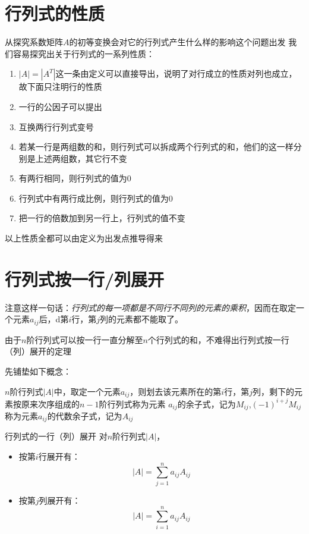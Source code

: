 \section{行列式的性质}
从探究系数矩阵$A$的初等变换会对它的行列式产生什么样的影响这个问题出发
我们容易探究出关于行列式的一系列性质：

\begin{enumerate}
    \item $|A| = |A^T|$这一条由定义可以直接导出，说明了对行成立的性质对列也成立，故下面只注明行的性质
    \item 一行的公因子可以提出
    \item 互换两行行列式变号
    \item 若某一行是两组数的和，则行列式可以拆成两个行列式的和，他们的这一样分别是上述两组数，其它行不变
    \item 有两行相同，则行列式的值为0
    \item 行列式中有两行成比例，则行列式的值为0
    \item 把一行的倍数加到另一行上，行列式的值不变
\end{enumerate}

以上性质全都可以由定义为出发点推导得来

\section{行列式按一行/列展开}
注意这样一句话：\emph{行列式的每一项都是不同行不同列的元素的乘积}，因而在取定一个元素$a_{ij}$后，d第$i$行，第$j$列的元素都不能取了。

由于$n$阶行列式可以按一行一直分解至$n$个行列式的和，不难得出行列式按一行（列）展开的定理

先铺垫如下概念：
\begin{definition}[（代数）余子式]
    $n$阶行列式$|A|$中，取定一个元素$a_{ij}$，则划去该元素所在的第$i$行，第$j$列，剩下的元素按原来次序组成的$n-1$阶行列式称为元素
    $a_{ij}$的余子式，记为$M_{ij}$,$(-1)^{i+j}M_{ij}$称为元素$a_{ij}$的代数余子式，记为$A_{ij}$
\end{definition}

\begin{theorem}
行列式的一行（列）展开
对$n$阶行列式$|A|$，
    \begin{itemize}
        \item 按第$i$行展开有：\begin{equation*}
            |A| = \sum_{j=1}^{n}a_{ij}A_{ij}
        \end{equation*}
        \item 按第$j$列展开有：\begin{equation*}
            |A| = \sum_{i=1}^{n}a_{ij}A_{ij}
        \end{equation*}
    \end{itemize}
\end{theorem}

